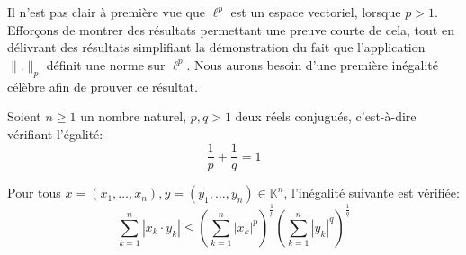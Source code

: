 Il n'est pas clair à première vue que $\ell^p$ est un espace
vectoriel, lorsque $p>1$. Efforçons de montrer des résultats
permettant une preuve courte de cela, tout en délivrant
des résultats simplifiant la démonstration du fait
que l'application $\|.\|_p$ définit une
norme sur $\ell^p$.
Nous aurons besoin d'une première inégalité célèbre afin
de prouver ce résultat.

\begin{thm}
  Soient $n\geq 1$ un nombre naturel, $p, q>1$ deux réels
  conjugués, c'est-à-dire vérifiant l'égalité:
  $$\frac{1}{p}+\frac{1}{q}=1$$

  Pour tous $x=(x_1, \ldots, x_n), y=(y_1, \ldots, y_n)\in
  \mathbb{K}^n$, l'inégalité suivante est vérifiée:
  $$\sum_{k=1}^n|x_k\cdot y_k|\leq
  \left(\sum_{k=1}^n|x_k|^p\right)^{\frac{1}{p}}
  \left(\sum_{k=1}^n|y_k|^q\right)^{\frac{1}{q}}$$
\end{thm}
